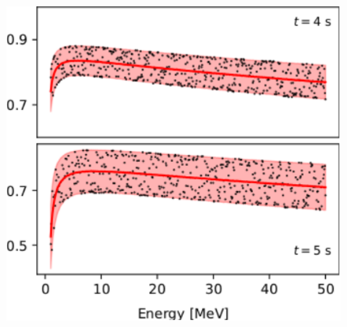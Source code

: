 \documentclass[10pt]{beamer}
\begin{document}
\begin{frame}
\begin{minipage}{0.45\textwidth}
\begin{figure}[hbt!]
            \includegraphics[width=\textwidth]{fig/6_2.pdf}
        \end{figure}
    \end{minipage}
\end{frame}
\end{document}
